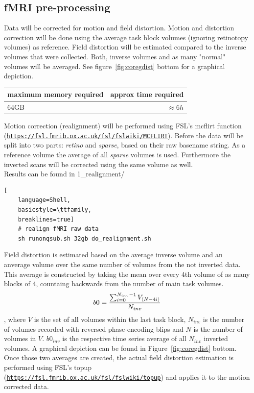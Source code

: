 \documentclass[12pt,a4paper]{scrartcl}
\begin{document}
\subsection{fMRI pre-processing}
Data will be corrected for motion and field distortion. Motion and distortion correction will be done using the average task block volumes (ignoring retinotopy volumes) as reference. Field distortion will be estimated compared to the inverse volumes that were collected. Both, inverse volumes and as many "normal" volumes will be averaged. See figure~\ref{fig:coregdist} bottom for a graphical depiction.
\begin{table}[h]
\begin{tabular}{l | r}
\toprule
maximum memory required & approx time required\\\toprule
64GB & $\approx 6h$ \\\bottomrule
\end{tabular}
\end{table}
\FloatBarrier
\noindent Motion correction (realignment) will be performed using FSL's mcflirt function (\href{https://fsl.fmrib.ox.ac.uk/fsl/fslwiki/MCFLIRT}{\nolinkurl{https://fsl.fmrib.ox.ac.uk/fsl/fslwiki/MCFLIRT}}). Before the data will be split into two parts: \textit{retino} and  \textit{sparse}, based on their raw basename string. As a reference volume the average of all \textit{sparse} volumes is used. Furthermore the inverted scans will be corrected using the same volume as well.\\

\noindent Results can be found in 1\_realignment/\\
\begin{lstlisting}[
    language=Shell,
    basicstyle=\ttfamily,
    breaklines=true]
    # realign fMRI raw data
    sh runonqsub.sh 32gb do_realignment.sh
\end{lstlisting}
Field distortion is estimated based on the average inverse volume and an anverage volume over the same number of volumes from the not inverted data. This average is constructed by taking the mean over every 4th volume of as many blocks of 4, countaing backwards from the number of main task volumes.
\begin{equation}
\centering
b0=\frac{\sum_{i=0}^{N_{inv}-1}V_{(N-4i)}}{N_{inv}}
\end{equation}
\noindent, where $V$ is the set of all volumes within the last task block, $N_{inv}$ is the number of volumes recorded with reversed phase-encoding blips and $N$ is the number of volumes in $V$. $b0_{inv}$ is the respective time series average of all $N_{inv}$ inverted volumes. A graphical depiction can be found in Figure~\ref{fig:coregdist} bottom. Once those two averages are created, the actual field distortion estimation is performed using FSL's topup (\href{https://fsl.fmrib.ox.ac.uk/fsl/fslwiki/topup}{\nolinkurl{https://fsl.fmrib.ox.ac.uk/fsl/fslwiki/topup}}) and applies it to the motion corrected data.\\
\end{document}
